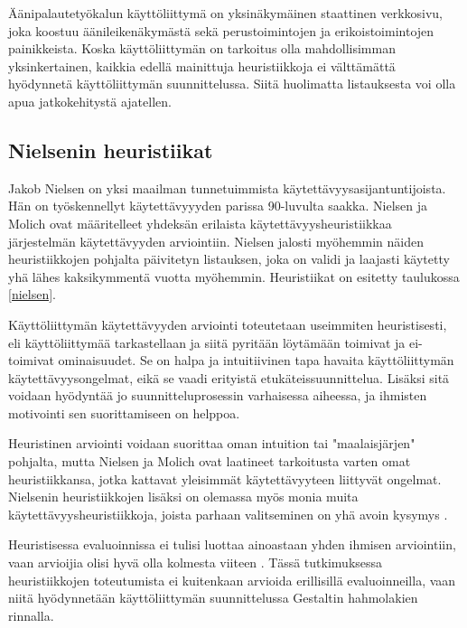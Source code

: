 \documentclass[utf8]{gradu3}
\begin{document}
Äänipalautetyökalun käyttöliittymä on yksinäkymäinen staattinen verkkosivu, joka koostuu  äänileikenäkymästä sekä perustoimintojen ja erikoistoimintojen painikkeista. Koska käyttöliittymän on tarkoitus olla mahdollisimman yksinkertainen, kaikkia edellä mainittuja heuristiikkoja ei välttämättä hyödynnetä käyttöliittymän suunnittelussa. Siitä huolimatta listauksesta voi olla apua jatkokehitystä ajatellen. 

\subsection{Nielsenin heuristiikat}

Jakob Nielsen on yksi maailman tunnetuimmista käytettävyysasijantuntijoista. Hän on työskennellyt käytettävyyyden parissa 90-luvulta saakka. Nielsen ja Molich \parencite*{improving-human} ovat määritelleet yhdeksän erilaista käytettävyysheuristiikkaa järjestelmän käytettävyyden arviointiin. Nielsen \parencite*{enhancing} jalosti myöhemmin näiden heuristiikkojen pohjalta päivitetyn listauksen, joka on validi ja laajasti käytetty yhä lähes kaksikymmentä vuotta myöhemmin. Heuristiikat on esitetty taulukossa \ref{nielsen}.

Käyttöliittymän käytettävyyden arviointi toteutetaan useimmiten heuristisesti, eli käyttöliittymää tarkastellaan ja siitä pyritään löytämään toimivat ja ei-toimivat ominaisuudet. Se on halpa ja intuitiivinen tapa havaita käyttöliittymän käytettävyysongelmat, eikä se vaadi erityistä etukäteissuunnittelua. Lisäksi sitä voidaan hyödyntää jo suunnitteluprosessin varhaisessa aiheessa, ja ihmisten motivointi sen suorittamiseen on helppoa. \parencite{heuristic-evaluation}

Heuristinen arviointi voidaan suorittaa oman intuition tai "maalaisjärjen" pohjalta, mutta Nielsen ja Molich \parencite*{heuristic-evaluation} ovat laatineet tarkoitusta varten omat heuristiikkansa, jotka kattavat yleisimmät käytettävyyteen liittyvät ongelmat. Nielsenin heuristiikkojen lisäksi on olemassa myös monia muita käytettävyysheuristiikkoja, joista parhaan valitseminen on yhä avoin kysymys \parencite{enhancing}. 

Heuristisessa evaluoinnissa ei tulisi luottaa ainoastaan yhden ihmisen arviointiin, vaan arvioijia olisi hyvä olla kolmesta viiteen \parencite{heuristic-evaluation}. Tässä tutkimuksessa heuristiikkojen toteutumista ei kuitenkaan arvioida erillisillä evaluoinneilla, vaan niitä hyödynnetään käyttöliittymän suunnittelussa Gestaltin hahmolakien rinnalla.
\end{document}
